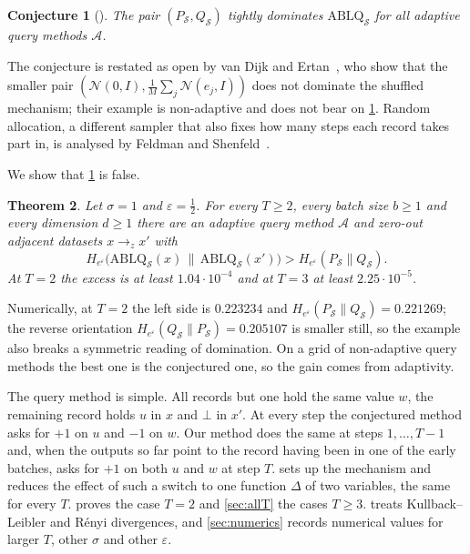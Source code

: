 \documentclass[11pt]{amsart}
\newtheorem{theorem}{Theorem}[section]
\newtheorem{conjecture}[theorem]{Conjecture}
\theoremstyle{definition}
\theoremstyle{remark}
\newcommand{\N}{\mathcal N}
\newcommand{\He}{H_{e^{\varepsilon}}}
\begin{document}
\begin{conjecture}[{\cite[Conjecture~3.2]{CGKKMSZ24}}]\label{conj:CGKKMSZ}
The pair $(P_{\mathcal S},Q_{\mathcal S})$ tightly dominates $\mathrm{ABLQ}_{\mathcal S}$ for all adaptive query methods $\mathcal A$.
\end{conjecture}

The conjecture is restated as open by van Dijk and Ertan~\cite[Appendix~J]{vDE26}, who show that the smaller pair $(\N(0,I),\frac1M\sum_j\N(e_j,I))$ does not dominate the shuffled mechanism; their example is non-adaptive and does not bear on \cref{conj:CGKKMSZ}. Random allocation, a different sampler that also fixes how many steps each record takes part in, is analysed by Feldman and Shenfeld~\cite{FS25}.

We show that \cref{conj:CGKKMSZ} is false.

\begin{theorem}\label{thm:main}
Let $\sigma=1$ and $\varepsilon=\frac12$. For every $T\ge2$, every batch size $b\ge1$ and every dimension $d\ge1$ there are an adaptive query method $\mathcal A$ and zero-out adjacent datasets $x\to_z x'$ with
\[
\He\bigl(\mathrm{ABLQ}_{\mathcal S}(x)\,\big\|\,\mathrm{ABLQ}_{\mathcal S}(x')\bigr)>\He(P_{\mathcal S}\|Q_{\mathcal S}).
\]
At $T=2$ the excess is at least $1.04\cdot10^{-4}$ and at $T=3$ at least $2.25\cdot10^{-5}$.
\end{theorem}

Numerically, at $T=2$ the left side is $0.223234$ and $\He(P_{\mathcal S}\|Q_{\mathcal S})=0.221269$; the reverse orientation $\He(Q_{\mathcal S}\|P_{\mathcal S})=0.205107$ is smaller still, so the example also breaks a symmetric reading of domination. On a grid of non-adaptive query methods the best one is the conjectured one, so the gain comes from adaptivity.

The query method is simple. All records but one hold the same value $w$, the remaining record holds $u$ in $x$ and $\bot$ in $x'$. At every step the conjectured method asks for $+1$ on $u$ and $-1$ on $w$. Our method does the same at steps $1,\dots,T-1$ and, when the outputs so far point to the record having been in one of the early batches, asks for $+1$ on both $u$ and $w$ at step $T$.  sets up the mechanism and reduces the effect of such a switch to one function $\Delta$ of two variables, the same for every $T$.  proves the case $T=2$ and \cref{sec:allT} the cases $T\ge3$.  treats Kullback--Leibler and R\'enyi divergences, and \cref{sec:numerics} records numerical values for larger $T$, other $\sigma$ and other $\varepsilon$.
\end{document}
